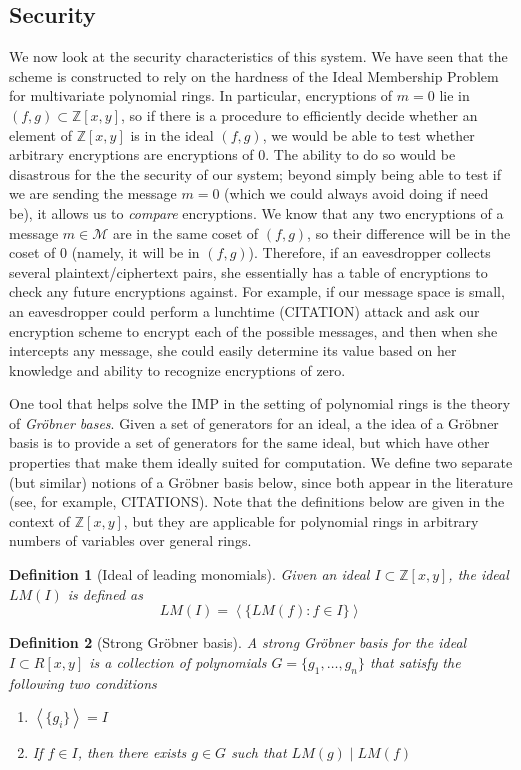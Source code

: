 \documentclass[11pt]{report}
\newtheorem{definition}{Definition}
\newcommand{\M}{\mathcal{M}}
\newcommand{\Zxy}{\mathbb{Z}[x,y]}
\begin{document}
\subsection{Security}
\label{sec:mv_security}
We now look at the security characteristics of this system. We have seen that the scheme is constructed to rely on the hardness of the Ideal Membership Problem for multivariate polynomial rings. In particular, encryptions of $m=0$ lie in $(f,g)\subset \Zxy$, so if there is a procedure to efficiently decide whether an element of $\Zxy$ is in the ideal $(f,g)$, we would be able to test whether arbitrary encryptions are encryptions of $0$. The ability to do so would be disastrous for the the security of our system; beyond simply being able to test if we are sending the message $m=0$ (which we could always avoid doing if need be), it allows us to \emph{compare} encryptions. We know that any two encryptions of a message $m\in \M$ are in the same coset of $(f,g)$, so their difference will be in the coset of $0$ (namely, it will be in $(f,g)$). Therefore, if an eavesdropper collects several plaintext/ciphertext pairs, she essentially has a table of encryptions to check any future encryptions against. For example, if our message space is small, an eavesdropper could perform a lunchtime (CITATION) attack and ask our encryption scheme to encrypt each of the possible messages, and then when she intercepts any message, she could easily determine its value based on her knowledge and ability to recognize encryptions of zero.

One tool that helps solve the IMP in the setting of polynomial rings is the theory of \emph{Gr\"obner bases}. Given a set of generators for an ideal, a the idea of a Gr\"obner basis is to provide a set of generators for the same ideal, but which have other properties that make them ideally suited for computation. We define two separate (but similar) notions of a Gr\"obner basis below, since both appear in the literature (see, for example, CITATIONS). Note that the definitions below are given in the context of $\Zxy$, but they are applicable for polynomial rings in arbitrary numbers of variables over general rings.

\begin{definition}[Ideal of leading monomials]
Given an ideal $I\subset \Zxy$, the ideal $LM(I)$ is defined as
\[LM(I) = \left\langle\{LM(f) : f\in I\}\right\rangle \]
\end{definition}

\begin{definition}[Strong Gr\"obner basis]
A \emph{strong Gr\"obner basis} for the ideal $I\subset R[x,y]$ is a collection of polynomials $G=\{g_1,\dots,g_n\}$ that satisfy the following two conditions
\begin{enumerate}
\item $\left\langle\{g_i\}\right\rangle = I$
\item If $f\in I$, then there exists $g\in G$ such that $LM(g) \mid LM(f)$
\end{enumerate}
\end{definition}
\end{document}
